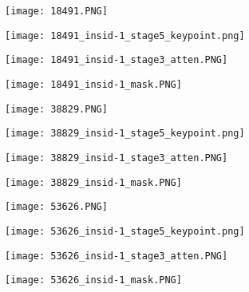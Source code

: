 \begin{figure}[htbp]
\begin{minipage}[t]{\linewidth}
		\vskip5pt
		\begin{minipage}[t]{0.23\linewidth}
			\texttt{[image: 18491.PNG]}
		\end{minipage}
		\begin{minipage}[t]{0.23\linewidth}
			\texttt{[image: 18491\_insid-1\_stage5\_keypoint.png]}
		\end{minipage}
		\begin{minipage}[t]{0.23\linewidth}
			\texttt{[image: 18491\_insid-1\_stage3\_atten.PNG]}
		\end{minipage}
		\begin{minipage}[t]{0.23\linewidth}
			\texttt{[image: 18491\_insid-1\_mask.PNG]}
		\end{minipage}
		
		\vskip5pt
		\begin{minipage}[t]{0.23\linewidth}
			\texttt{[image: 38829.PNG]}
		\end{minipage}
		\begin{minipage}[t]{0.23\linewidth}
			\texttt{[image: 38829\_insid-1\_stage5\_keypoint.png]}
		\end{minipage}
		\begin{minipage}[t]{0.23\linewidth}
			\texttt{[image: 38829\_insid-1\_stage3\_atten.PNG]}
		\end{minipage}
		\begin{minipage}[t]{0.23\linewidth}
			\texttt{[image: 38829\_insid-1\_mask.PNG]}
		\end{minipage}
		
		\vskip5pt
		\begin{minipage}[t]{0.23\linewidth}
			\texttt{[image: 53626.PNG]}
		\end{minipage}
		\begin{minipage}[t]{0.23\linewidth}
			\texttt{[image: 53626\_insid-1\_stage5\_keypoint.png]}
		\end{minipage}
		\begin{minipage}[t]{0.23\linewidth}
			\texttt{[image: 53626\_insid-1\_stage3\_atten.PNG]}
		\end{minipage}
		\begin{minipage}[t]{0.23\linewidth}
			\texttt{[image: 53626\_insid-1\_mask.PNG]}
		\end{minipage}
		

\end{minipage}
\end{figure}
